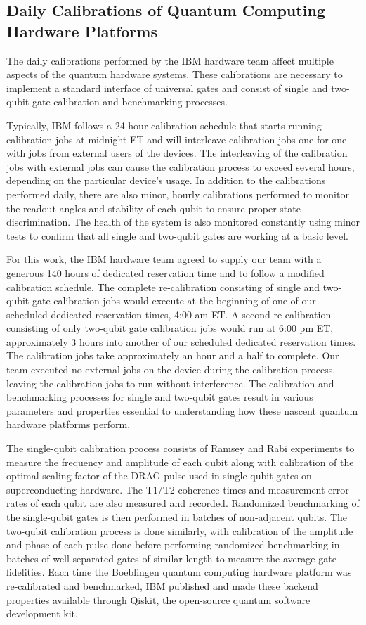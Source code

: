 \begin{appendix}
\section{Daily Calibrations of Quantum Computing Hardware Platforms}

The daily calibrations performed by the IBM hardware team affect multiple aspects of the quantum hardware systems. These calibrations are necessary to implement a standard interface of universal gates and consist of single and two-qubit gate calibration and benchmarking processes. 

Typically, IBM follows a 24-hour calibration schedule that starts running calibration jobs at midnight ET and will interleave calibration jobs one-for-one with jobs from external users of the devices. The interleaving of the calibration jobs with external jobs can cause the calibration process to exceed several hours, depending on the particular device’s usage. In addition to the calibrations performed daily, there are also minor, hourly calibrations performed to monitor the readout angles and stability of each qubit to ensure proper state discrimination. The health of the system is also monitored constantly using minor tests to confirm that all single and two-qubit gates are working at a basic level. 

For this work, the IBM hardware team agreed to supply our team with a generous 140 hours of dedicated reservation time and to follow a modified calibration schedule. The complete re-calibration consisting of single and two-qubit gate calibration jobs would execute at the beginning of one of our scheduled dedicated reservation times, 4:00 am ET. A second re-calibration consisting of only two-qubit gate calibration jobs would run at 6:00 pm ET, approximately 3 hours into another of our scheduled dedicated reservation times. The calibration jobs take approximately an hour and a half to complete. Our team executed no external jobs on the device during the calibration process, leaving the calibration jobs to run without interference. The calibration and benchmarking processes for single and two-qubit gates result in various parameters and properties essential to understanding how these nascent quantum hardware platforms perform.

The single-qubit calibration process consists of Ramsey and Rabi experiments to measure the frequency and amplitude of each qubit along with calibration of the optimal scaling factor of the DRAG pulse used in single-qubit gates on superconducting hardware. The T1/T2 coherence times and measurement error rates of each qubit are also measured and recorded. Randomized benchmarking of the single-qubit gates is then performed in batches of non-adjacent qubits. The two-qubit calibration process is done similarly, with calibration of the amplitude and phase of each pulse done before performing randomized benchmarking in batches of well-separated gates of similar length to measure the average gate fidelities. Each time the Boeblingen quantum computing hardware platform was re-calibrated and benchmarked, IBM published and made these backend properties available through Qiskit, the open-source quantum software development kit. 
\end{appendix}